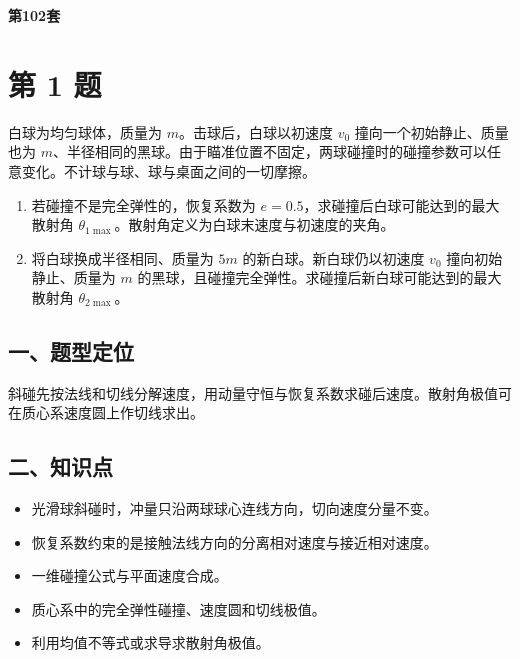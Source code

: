 \documentclass[12pt,a4paper,UTF8]{ctexart}
\newcommand{\tightlist}{\setlength{\itemsep}{0pt}\setlength{\parskip}{0pt}}
\begin{document}
\begin{titlepage}
  \centering
  \vspace*{58mm}
  {\Huge\bfseries\color{ContestBlue} 第102套\par}
  \vfill
  \vspace*{28mm}
\end{titlepage}


\section{第 1 题}\label{ux7b2c-1-ux9898}

白球为均匀球体，质量为 \(m\)。击球后，白球以初速度 \(v_0\)
撞向一个初始静止、质量也为
\(m\)、半径相同的黑球。由于瞄准位置不固定，两球碰撞时的碰撞参数可以任意变化。不计球与球、球与桌面之间的一切摩擦。

\begin{enumerate}
\def\labelenumi{\arabic{enumi}.}
\tightlist
\item
  若碰撞不是完全弹性的，恢复系数为
  \(e=0.5\)，求碰撞后白球可能达到的最大散射角
  \(\theta_{1\max}\)。散射角定义为白球末速度与初速度的夹角。
\item
  将白球换成半径相同、质量为 \(5m\) 的新白球。新白球仍以初速度 \(v_0\)
  撞向初始静止、质量为 \(m\)
  的黑球，且碰撞完全弹性。求碰撞后新白球可能达到的最大散射角
  \(\theta_{2\max}\)。
\end{enumerate}

\subsection{一、题型定位}\label{ux4e00ux9898ux578bux5b9aux4f4d}

斜碰先按法线和切线分解速度，用动量守恒与恢复系数求碰后速度。散射角极值可在质心系速度圆上作切线求出。

\subsection{二、知识点}\label{ux4e8cux77e5ux8bc6ux70b9}

\begin{itemize}
\tightlist
\item
  光滑球斜碰时，冲量只沿两球球心连线方向，切向速度分量不变。
\item
  恢复系数约束的是接触法线方向的分离相对速度与接近相对速度。
\item
  一维碰撞公式与平面速度合成。
\item
  质心系中的完全弹性碰撞、速度圆和切线极值。
\item
  利用均值不等式或求导求散射角极值。
\end{itemize}
\end{document}
